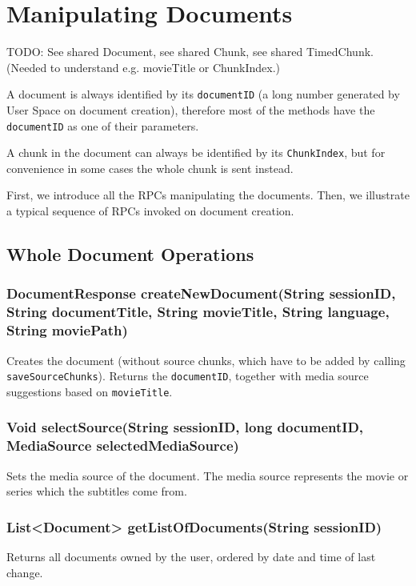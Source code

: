\section{Manipulating Documents}
\label{sec:rpc:doc}

TODO: See shared Document, see shared Chunk, see shared TimedChunk.
(Needed to understand e.g. movieTitle or ChunkIndex.)

A document is always identified by its {\tt documentID} (a long number generated by User Space on document creation), therefore most of the methods have the {\tt documentID} as one of their parameters.

A chunk in the document can always be identified by its {\tt ChunkIndex}, but for convenience in some cases the whole chunk is sent instead.

First, we introduce all the RPCs manipulating the documents. Then, we illustrate a typical sequence of RPCs invoked on document creation.

\subsection{Whole Document Operations}

\subsubsection{DocumentResponse createNewDocument(String sessionID, String documentTitle, String movieTitle, String language, String moviePath)}

Creates the document
(without source chunks, which have to be added by calling {\tt saveSourceChunks}).
Returns the {\tt documentID}, together with media source suggestions based on {\tt movieTitle}.
     	
\subsubsection{Void selectSource(String sessionID, long documentID, MediaSource selectedMediaSource)}
Sets the media source of the document. The media source represents the movie or series which the subtitles come from.

\subsubsection{List<Document> getListOfDocuments(String sessionID)}
Returns all documents owned by the user, ordered by date and time of last change.

